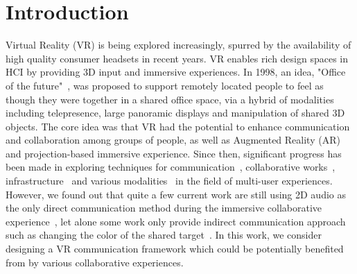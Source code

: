 \documentclass{sigchi}
\begin{document}
\section{Introduction}
Virtual Reality (VR) is being explored increasingly, spurred by the availability of high quality consumer headsets in recent years. VR enables rich design spaces in HCI by providing 3D input and immersive experiences. In 1998, an idea, "Office of the future"~\cite{raskar1998office}, was proposed to support remotely located people to feel as though they were together in a shared office space, via a hybrid of modalities including telepresence, large panoramic displays and manipulation of shared 3D objects. The core idea was that VR had the potential to enhance communication and collaboration among groups of people, as well as Augmented Reality (AR) and projection-based immersive experience. Since then, significant progress has been made in exploring techniques for communication~\cite{ishii1993integration, otsuka2016mmspace}, collaborative works~\cite{kunert2014photoportals,tang2010three}, infrastructure~\cite{maimone2013general, o2011blended, thomas2014muvr} and various modalities~\cite{follmer2013inform, leithinger2014physical, leithinger2015shape, nakagaki2019inforce} in the field of multi-user experiences. However, we found out that quite a few current work are still using 2D audio as the only direct communication method during the immersive collaborative experience~\cite{xia2018spacetime}, let alone some work only provide indirect communication approach such as changing the color of the shared target~\cite{huo2018synchronizar}. In this work, we consider designing a VR communication framework which could be potentially benefited from by various collaborative experiences.
\end{document}

